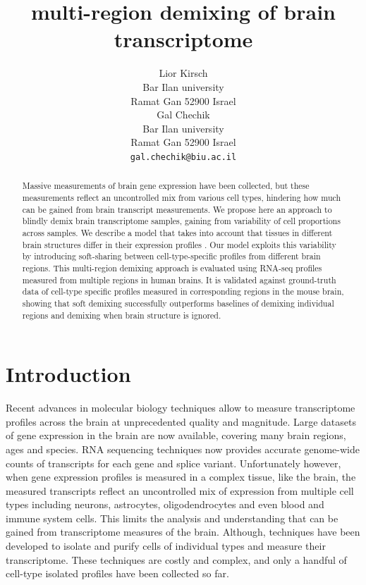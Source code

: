 \documentclass{article} %
\title{multi-region demixing of brain transcriptome}
\author{
Lior Kirsch \\ Bar Ilan university \\ Ramat Gan 52900 Israel \\ 
\And
Gal Chechik \\ Bar Ilan university \\ Ramat Gan 52900 Israel \\
\texttt{gal.chechik@biu.ac.il} \\
}
\begin{document}
\maketitle

\begin{abstract}
    Massive measurements of brain gene expression have been collected, but these measurements reflect an uncontrolled mix from various cell types, hindering how much can be gained from brain transcript measurements. We propose here an approach to blindly demix brain transcriptome samples, gaining from variability of cell proportions across samples. We describe a model that takes into account that tissues in different brain structures differ in their expression profiles%
. Our model exploits this variability by introducing soft-sharing between cell-type-specific profiles from different brain regions. 
    This multi-region demixing approach is evaluated using RNA-seq profiles measured from multiple regions in human brains. It is validated against ground-truth data of cell-type specific profiles measured in corresponding regions in the mouse brain, showing that soft demixing successfully outperforms baselines of demixing individual regions and demixing when brain structure is ignored. 
\end{abstract}

\section{Introduction}
\label{introduction}


Recent advances in molecular biology techniques allow to measure transcriptome profiles across the brain at unprecedented quality and magnitude. Large datasets of gene expression in the brain are now available, covering  many brain regions, ages and species. RNA sequencing techniques now provides accurate genome-wide counts of transcripts for each gene and splice variant. Unfortunately however, when gene expression profiles is measured in a complex tissue, like the brain, the measured transcripts reflect an uncontrolled mix of expression from multiple cell types including neurons, astrocytes, oligodendrocytes and even blood and immune system cells. This limits the analysis and understanding that can be gained from transcriptome measures of the brain. Although, techniques have been developed to isolate and purify cells of individual types and measure their transcriptome. These techniques are costly and complex, and only a handful of cell-type isolated profiles have been collected so far. 
\end{document}
